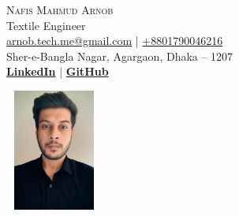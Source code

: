 
\begin{minipage}{0.70\textwidth}
	{\Huge\scshape Nafis Mahmud Arnob}\\[0.7em]
	{\Large Textile Engineer}\\[0.5em]
	\href{mailto:arnob.tech.me@gmail.com}{arnob.tech.me@gmail.com}  |
	\href{tel:+8801790046216}{+8801790046216}
	\\ Sher-e-Bangla Nagar, Agargaon, Dhaka – 1207\\[0.7em]
	\textbf{\href{https://www.linkedin.com/in/arnob-mahmud/}{LinkedIn}}  |
	\textbf{\href{https://github.com/ArnobMahmud}{GitHub}}
\end{minipage}
\hfill
\begin{minipage}{0.22\textwidth}
    \includegraphics[width=3.2cm,height=4cm]{Assets/Arnob.png}
\end{minipage}
